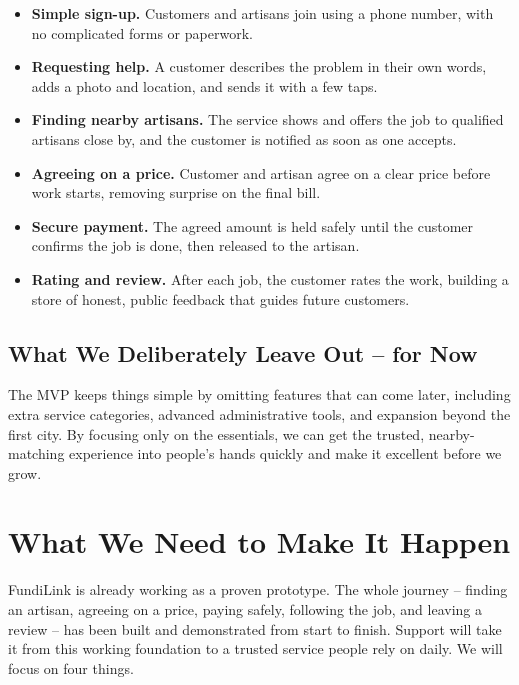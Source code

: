 \documentclass[11pt,a4paper]{article}
\begin{document}
\begin{itemize}[leftmargin=1.5em, label={--}]
    \item \textbf{Simple sign-up.} Customers and artisans join using a phone number, with no
          complicated forms or paperwork.
    \item \textbf{Requesting help.} A customer describes the problem in their own words, adds
          a photo and location, and sends it with a few taps.
    \item \textbf{Finding nearby artisans.} The service shows and offers the job to qualified
          artisans close by, and the customer is notified as soon as one accepts.
    \item \textbf{Agreeing on a price.} Customer and artisan agree on a clear price before
          work starts, removing surprise on the final bill.
    \item \textbf{Secure payment.} The agreed amount is held safely until the customer
          confirms the job is done, then released to the artisan.
    \item \textbf{Rating and review.} After each job, the customer rates the work, building a
          store of honest, public feedback that guides future customers.
\end{itemize}

\subsection{What We Deliberately Leave Out -- for Now}

The MVP keeps things simple by omitting features that can come later, including extra service
categories, advanced administrative tools, and expansion beyond the first city. By focusing
only on the essentials, we can get the trusted, nearby-matching experience into people's hands
quickly and make it excellent before we grow.

\section{What We Need to Make It Happen}

FundiLink is already working as a proven prototype. The whole journey -- finding an artisan,
agreeing on a price, paying safely, following the job, and leaving a review -- has been built
and demonstrated from start to finish. Support will take it from this working foundation to a
trusted service people rely on daily. We will focus on four things.
\end{document}
